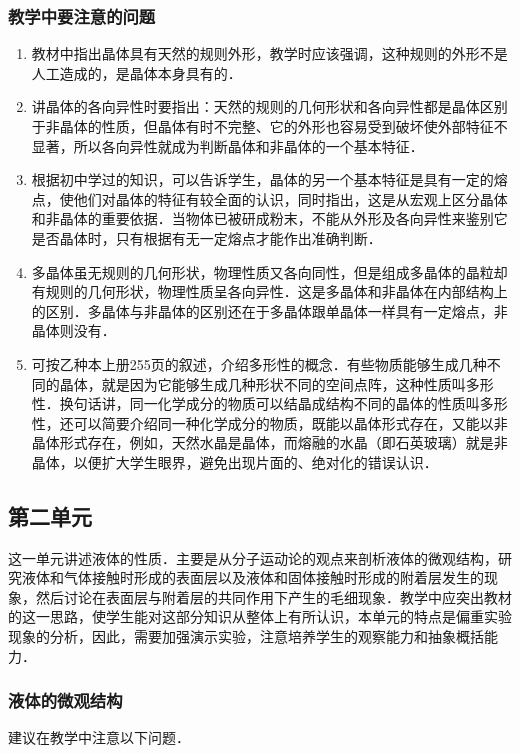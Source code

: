 \subsubsection{教学中要注意的问题}
\begin{enumerate}
\item 教材中指出晶体具有天然的规则外形，教学时应该强调，这种规则的外形不是人工造成的，是晶体本身具有的．
\item 讲晶体的各向异性时要指出：天然的规则的几何形状和各向异性都是晶体区别于非晶体的性质，但晶体有时不完整、它的外形也容易受到破坏使外部特征不显著，所以各向异性就成为判断晶体和非晶体的一个基本特征．
\item 根据初中学过的知识，可以告诉学生，晶体的另一个基本特征是具有一定的熔点，使他们对晶体的特征有较全面的认识，同时指出，这是从宏观上区分晶体和非晶体的重要依据．当物体已被研成粉末，不能从外形及各向异性来鉴别它是否晶体时，只有根据有无一定熔点才能作出准确判断．
\item 多晶体虽无规则的几何形状，物理性质又各向同性，但是组成多晶体的晶粒却有规则的几何形状，物理性质呈各向异性．这是多晶体和非晶体在内部结构上的区别．多晶体与非晶体的区别还在于多晶体跟单晶体一样具有一定熔点，非晶体则没有．
\item 可按乙种本上册255页的叙述，介绍多形性的概念．有些物质能够生成几种不同的晶体，就是因为它能够生成几种形状不同的空间点阵，这种性质叫多形性．换句话讲，同一化学成分的物质可以结晶成结构不同的晶体的性质叫多形性，还可以简要介绍同一种化学成分的物质，既能以晶体形式存在，又能以非晶体形式存在，例如，天然水晶是晶体，而熔融的水晶（即石英玻璃）就是非晶体，以便扩大学生眼界，避免出现片面的、绝对化的错误认识．
\end{enumerate}



\subsection{第二单元}
这一单元讲述液体的性质．主要是从分子运动论的观点来剖析液体的微观结构，研究液体和气体接触时形成的表面层以及液体和固体接触时形成的附着层发生的现象，然后讨论在表面层与附着层的共同作用下产生的毛细现象．教学中应突出教材的这一思路，使学生能对这部分知识从整体上有所认识，本单元的特点是偏重实验现象的分析，因此，需要加强演示实验，注意培养学生的观察能力和抽象概括能力．

\subsubsection{液体的微观结构}

建议在教学中注意以下问题．

